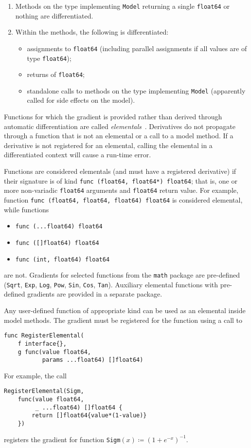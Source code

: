 \documentclass[sigplan,review,10pt,anonymous]{acmart}
\begin{document}
\begin{sloppypar}
\begin{enumerate}
	\item Methods on the type implementing \lstinline{Model} returning a
		single \lstinline{float64} or nothing are differentiated.
	\item Within the methods, the following is differentiated:
		\begin{itemize}
			\item assignments to \lstinline{float64} (including parallel
				assignments if all values are of type
				\lstinline{float64});
			\item returns of \lstinline{float64};
			\item standalone calls to methods on the type implementing
				\lstinline{Model} (apparently called for side  effects on
				the model).
		\end{itemize}
\end{enumerate}

Functions for which the gradient is provided rather than derived
through automatic differentiation are called
\textit{elementals}~\cite{GW08}.  Derivatives do not propagate
through a function that is not an elemental or a call to a model
method. If a derivative is not registered for an elemental,
calling the elemental in a differentiated context will cause a
run-time error.

Functions are considered elementals (and must have a
registered derivative) if their signature is of kind
\lstinline{func (float64, float64*) float64}; that is, 
one or more non-variadic \lstinline{float64} arguments and
\lstinline{float64} return value. For example, function
\lstinline{func (float64, float64, float64) float64}
is considered elemental, while functions
\begin{itemize}
	\item \lstinline{func (...float64) float64}
	\item \lstinline{func ([]float64) float64}
	\item \lstinline{func (int, float64) float64}
\end{itemize}
are not. Gradients for selected functions from the
\lstinline{math} package are pre-defined (\lstinline{Sqrt},
\lstinline{Exp}, \lstinline{Log}, \lstinline{Pow},
\lstinline{Sin}, \lstinline{Cos}, \lstinline{Tan}). Auxiliary
elemental functions with pre-defined gradients are provided in a
separate package.

Any user-defined function of appropriate kind can be used as an
elemental inside model methods. The gradient must be registered
for the function using a call to
\begin{lstlisting}
func RegisterElemental(
	f interface{}, 
	g func(value float64,
		   params ...float64) []float64)
\end{lstlisting} For
example, the call
\begin{lstlisting}
RegisterElemental(Sigm,
	func(value float64,
	     _ ...float64) []float64 {
		return []float64{value*(1-value)}
	})
\end{lstlisting}
registers the gradient for function
\lstinline{Sigm}$(x)\coloneq\left(1+e^{-x}\right)^{-1}$.


\end{sloppypar}
\end{document}
